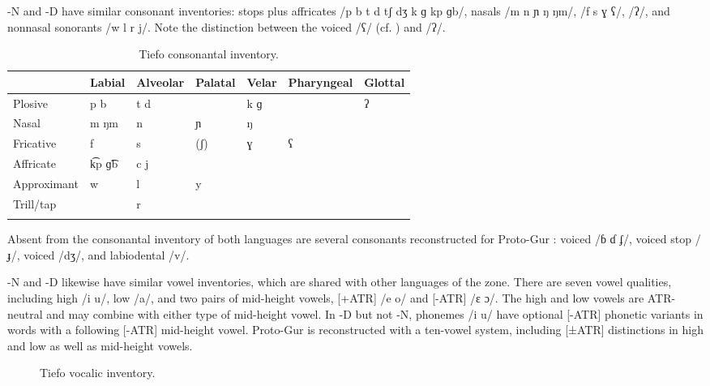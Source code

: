 \documentclass[output=paper,
modfonts
]{langscibook}
\begin{document}
-N and -D have similar consonant inventories: stops plus  affricates /p b t d tʃ dʒ k ɡ kp ɡb/, nasals /m n ɲ ŋ ŋm/,  /f s ɣ ʕ/,  /ʔ/, and nonnasal sonorants /w l r j/. Note the distinction between the voiced  /ʕ/ (cf. ) and  /ʔ/.

\begin{table}
\caption{Tiefo consonantal inventory.} 
\label{tab:hangtan:1}
\begin{tabularx}{\textwidth}{lXlXXll}
\lsptoprule
 & {\bfseries Labial} & {\bfseries Alveolar} & {\bfseries Palatal} & {\bfseries Velar} & {\bfseries Pharyngeal} & {\bfseries Glottal}\\
\midrule
{Plosive} & p b& t d&  & k ɡ&  & ʔ\\
{Nasal} & m ŋm& n& ɲ& ŋ&  & \\
{Fricative} & f& s& (ʃ)& ɣ& ʕ& \\
{Affricate} & k͡p ɡ͡b& c j&  &  &  & \\
{Approximant} & w& l& y&  &  & \\
{Trill/tap} &  & r&  &  &  & \\
\lspbottomrule
\end{tabularx}


\end{table}

Absent from the consonantal inventory of both languages are several consonants reconstructed for Proto-Gur \citep{Naden1989}: voiced  /ɓ ɗ ʄ/, voiced  stop /ɟ/, voiced  /dʒ/, and labiodental  /v/.

-N and -D likewise have similar vowel inventories, which are shared with other languages of the zone. There are seven vowel qualities, including high /i u/, low /a/, and two pairs of mid-height vowels, [+ATR] /e o/ and [-ATR] /ɛ ɔ/. The high and low vowels are ATR-neutral and may combine with either type of mid-height vowel. In -D \citep[20, 23]{Winkelmann1998} but not -N, phonemes /i u/ have optional [-ATR] phonetic variants in words with a following [-ATR] mid-height vowel. Proto-Gur is reconstructed with a ten-vowel system, including [±ATR] distinctions in high and low as well as mid-height vowels.

  
\begin{figure} 
\centering
\parbox{.3\textwidth}{
\begin{vowel}
  
\end{vowel}
}


\caption{Tiefo vocalic inventory.}
\label{fig:1}
\end{figure}
\end{document}

